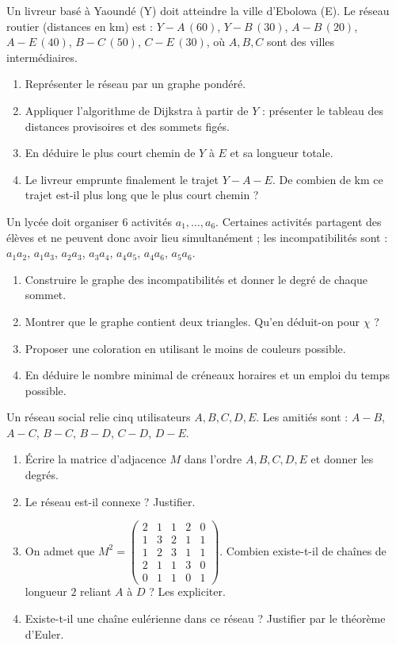 Un livreur basé à Yaoundé (Y) doit atteindre la ville d'Ebolowa (E). Le réseau routier
(distances en km) est : $Y\!-\!A\,(60)$, $Y\!-\!B\,(30)$, $A\!-\!B\,(20)$, $A\!-\!E\,(40)$,
$B\!-\!C\,(50)$, $C\!-\!E\,(30)$, où $A,B,C$ sont des villes intermédiaires.
\begin{enumerate}[label=\arabic*)]
\item Représenter le réseau par un graphe pondéré.
\item Appliquer l'algorithme de Dijkstra à partir de $Y$ : présenter le tableau des distances
provisoires et des sommets figés.
\item En déduire le plus court chemin de $Y$ à $E$ et sa longueur totale.
\item Le livreur emprunte finalement le trajet $Y\!-\!A\!-\!E$. De combien de km ce trajet
est-il plus long que le plus court chemin ?
\end{enumerate}

Un lycée doit organiser $6$ activités $a_1,\dots,a_6$. Certaines activités partagent des
élèves et ne peuvent donc avoir lieu simultanément ; les incompatibilités sont :
$a_1a_2$, $a_1a_3$, $a_2a_3$, $a_3a_4$, $a_4a_5$, $a_4a_6$, $a_5a_6$.
\begin{enumerate}[label=\arabic*)]
\item Construire le graphe des incompatibilités et donner le degré de chaque sommet.
\item Montrer que le graphe contient deux triangles. Qu'en déduit-on pour $\chi$ ?
\item Proposer une coloration en utilisant le moins de couleurs possible.
\item En déduire le nombre minimal de créneaux horaires et un emploi du temps possible.
\end{enumerate}

Un réseau social relie cinq utilisateurs $A,B,C,D,E$. Les amitiés sont : $A\!-\!B$, $A\!-\!C$,
$B\!-\!C$, $B\!-\!D$, $C\!-\!D$, $D\!-\!E$.
\begin{enumerate}[label=\arabic*)]
\item Écrire la matrice d'adjacence $M$ dans l'ordre $A,B,C,D,E$ et donner les degrés.
\item Le réseau est-il connexe ? Justifier.
\item On admet que $M^2=\begin{pmatrix}2&1&1&2&0\\1&3&2&1&1\\1&2&3&1&1\\2&1&1&3&0\\0&1&1&0&1\end{pmatrix}$.
Combien existe-t-il de chaînes de longueur $2$ reliant $A$ à $D$ ? Les expliciter.
\item Existe-t-il une chaîne eulérienne dans ce réseau ? Justifier par le théorème d'Euler.
\end{enumerate}

